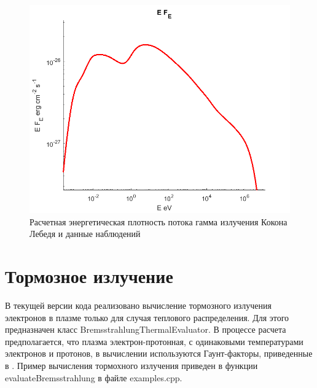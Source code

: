 \begin{figure}
	\centering
	\includegraphics[width=12.5 cm]{./fig/compton.png} 
	\caption{Расчетная энергетическая плотность потока гамма излучения Кокона Лебедя и данные наблюдений}
	\label{pion}
\end{figure}
\section{Тормозное излучение}
В текущей версии кода реализовано вычисление тормозного излучения электронов в плазме только для случая теплового распределения. Для этого предназначен класс BremsstrahlungThermalEvaluator. В процессе расчета предполагается, что плазма электрон-протонная, с одинаковыми температурами электронов и протонов, в вычислении используются Гаунт-факторы, приведенные в \cite{Rybicki}. Пример вычисления тормохного излучения приведен в функции evaluateBremsstrahlung в файле examples.cpp.

